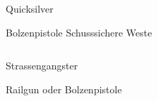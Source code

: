 \begin{column}[l]{0.45}
    \begin{nscsheet}[h]{Quicksilver}
        \nscstats[ATT=2,AGG=2,DEX=1,COM=2,CON=1]
        \nscruler
        \begin{nscinventory}
            \nscitem[Waffen] Bolzenpistole
            \nscitem[R"ustung] Schusssichere Weste
        \end{nscinventory}
    \end{nscsheet}
\end{column}
\begin{column}[r]{0.50}
    \begin{nscsheet}[h]{Strassengangster}
        \nscstats[ATT=2,AGG=2,DEX=1,CON=1]
        \nscruler
        \begin{nscinventory}
            \nscitem[Waffen] Railgun oder Bolzenpistole
        \end{nscinventory}
    \end{nscsheet}
\end{column}
